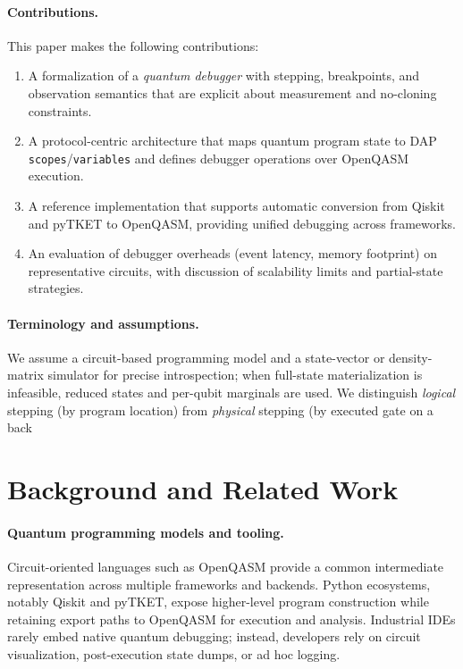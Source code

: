 \documentclass[12pt]{article}
\begin{document}
\paragraph{Contributions.}
This paper makes the following contributions:
\begin{enumerate}
  \item A formalization of a \emph{quantum debugger} with stepping, breakpoints, and observation semantics that are explicit about measurement and no-cloning constraints.
  \item A protocol-centric architecture that maps quantum program state to DAP \texttt{scopes}/\texttt{variables} and defines debugger operations over OpenQASM execution.
  \item A reference implementation that supports automatic conversion from Qiskit and pyTKET to OpenQASM, providing unified debugging across frameworks.
  \item An evaluation of debugger overheads (event latency, memory footprint) on representative circuits, with discussion of scalability limits and partial-state strategies.
\end{enumerate}

\paragraph{Terminology and assumptions.}
We assume a circuit-based programming model and a state-vector or density-matrix simulator for precise introspection; when full-state materialization is infeasible, reduced states and per-qubit marginals are used. We distinguish \emph{logical} stepping (by program location) from \emph{physical} stepping (by executed gate on a back



\section{Background and Related Work}
\label{sec:background}

\paragraph{Quantum programming models and tooling.}
Circuit-oriented languages such as OpenQASM provide a common intermediate representation across multiple frameworks and backends. Python ecosystems, notably Qiskit and pyTKET, expose higher-level program construction while retaining export paths to OpenQASM for execution and analysis. Industrial IDEs rarely embed native quantum debugging; instead, developers rely on circuit visualization, post-execution state dumps, or ad hoc logging.
\end{document}
